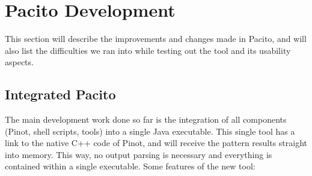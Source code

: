 \section{Pacito Development}
This section will describe the improvements and changes made in Pacito, and will also list the difficulties we ran into while testing out the tool and its usability aspects.

\subsection{Integrated Pacito}
The main development work done so far is the integration of all components (Pinot, shell scripts, tools) into a single Java executable. This single tool has a link to the native C++ code of Pinot, and will receive the pattern results straight into memory. This way, no output parsing is necessary and everything is contained within a single executable. Some features of the new tool:
